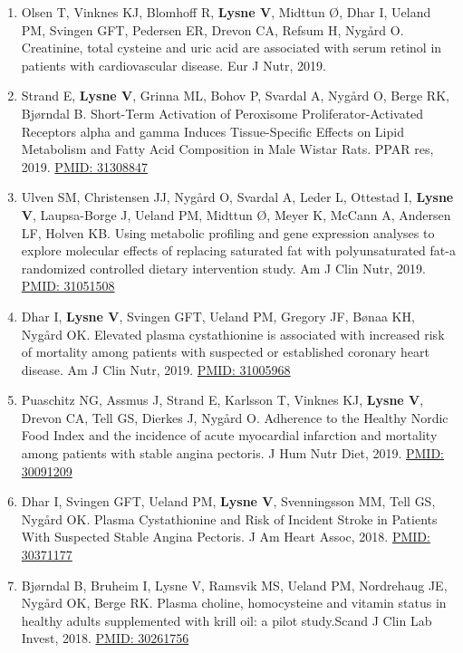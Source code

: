 \documentclass[11pt, a4paper]{awesome-cv}
\providecommand{\tightlist}{%
	\setlength{\itemsep}{0pt}\setlength{\parskip}{0pt}}
\begin{document}
\begin{enumerate}
\def\labelenumi{\arabic{enumi}.}
\tightlist
\item
  Olsen T, Vinknes KJ, Blomhoff R, \textbf{Lysne V}, Midttun Ø, Dhar I, Ueland PM, Svingen GFT, Pedersen ER, Drevon CA, Refsum H, Nygård O. Creatinine, total cysteine and uric acid are associated with serum retinol in patients with cardiovascular disease. Eur J Nutr, 2019.
\item
  Strand E, \textbf{Lysne V}, Grinna ML, Bohov P, Svardal A, Nygård O, Berge RK, Bjørndal B. Short-Term Activation of Peroxisome Proliferator-Activated Receptors alpha and gamma Induces Tissue-Specific Effects on Lipid Metabolism and Fatty Acid Composition in Male Wistar Rats. PPAR res, 2019. \href{https://www.ncbi.nlm.nih.gov/pubmed/31308847}{PMID: 31308847}
\item
  Ulven SM, Christensen JJ, Nygård O, Svardal A, Leder L, Ottestad I, \textbf{Lysne V}, Laupsa-Borge J, Ueland PM, Midttun Ø, Meyer K, McCann A, Andersen LF, Holven KB. Using metabolic profiling and gene expression analyses to explore molecular effects of replacing saturated fat with polyunsaturated fat-a randomized controlled dietary intervention study. Am J Clin Nutr, 2019. \href{https://www.ncbi.nlm.nih.gov/pubmed/31051508}{PMID: 31051508}
\item
  Dhar I, \textbf{Lysne V}, Svingen GFT, Ueland PM, Gregory JF, Bønaa KH, Nygård OK. Elevated plasma cystathionine is associated with increased risk of mortality among patients with suspected or established coronary heart disease. Am J Clin Nutr, 2019. \href{https://www.ncbi.nlm.nih.gov/pubmed/31005968}{PMID: 31005968}
\item
  Puaschitz NG, Assmus J, Strand E, Karlsson T, Vinknes KJ, \textbf{Lysne V}, Drevon CA, Tell GS, Dierkes J, Nygård O. Adherence to the Healthy Nordic Food Index and the incidence of acute myocardial infarction and mortality among patients with stable angina pectoris. J Hum Nutr Diet, 2019. \href{https://www.ncbi.nlm.nih.gov/pubmed/30091209}{PMID: 30091209}
\item
  Dhar I, Svingen GFT, Ueland PM, \textbf{Lysne V}, Svenningsson MM, Tell GS, Nygård OK. Plasma Cystathionine and Risk of Incident Stroke in Patients With Suspected Stable Angina Pectoris. J Am Heart Assoc, 2018. \href{https://www.ncbi.nlm.nih.gov/pubmed/30371177}{PMID: 30371177}
\item
  Bjørndal B, Bruheim I, Lysne V, Ramsvik MS, Ueland PM, Nordrehaug JE, Nygård OK, Berge RK. Plasma choline, homocysteine and vitamin status in healthy adults supplemented with krill oil: a pilot study.Scand J Clin Lab Invest, 2018. \href{https://www.ncbi.nlm.nih.gov/pubmed/30261756}{PMID: 30261756}

\end{enumerate}
\end{document}
